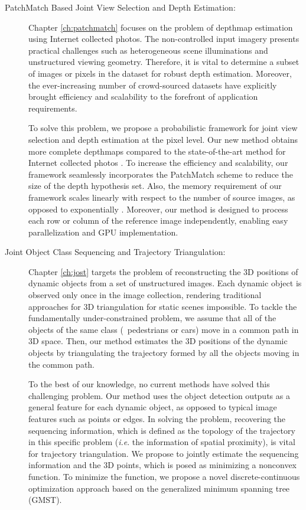 \begin{description}

\item[PatchMatch Based Joint View Selection and Depth Estimation:]
Chapter \ref{ch:patchmatch} focuses on the problem of depthmap estimation using Internet collected photos. The non-controlled input imagery presents practical challenges such as heterogeneous scene illuminations and unstructured viewing geometry. Therefore, it is vital to determine a subset of images or pixels in the dataset for robust depth estimation. Moreover, the ever-increasing number of crowd-sourced datasets have explicitly brought efficiency and scalability to the forefront of application requirements.

To solve this problem, we propose a probabilistic framework for joint view selection and depth estimation at the pixel level. Our new method obtains more complete depthmaps compared to the state-of-the-art method for Internet collected photos \cite{Goesele07}. To increase the efficiency and scalability, our framework seamlessly incorporates the PatchMatch scheme \cite{patchMatchStereo1} to  reduce the size of the depth hypothesis set. Also, the memory requirement of our framework scales linearly with respect to the number of source images, as opposed to exponentially \cite{CombinedDepthOutlier}. Moreover, our method is designed to process each row or column of the reference image independently, enabling easy parallelization and GPU implementation.

\item[Joint Object Class Sequencing and Trajectory Triangulation:]
Chapter \ref{ch:jost} targets the problem of reconstructing the 3D positions of dynamic objects from a set of unstructured images. Each dynamic object is observed only once in the image collection, rendering traditional approaches for 3D triangulation for static scenes impossible. To tackle the fundamentally under-constrained problem, we assume that all of the objects of the same class (\eg~pedestrians or cars) move in a common path in 3D space. Then, our method estimates the 3D positions of the dynamic objects by triangulating the trajectory formed by all the objects moving in the common path. 

To the best of our knowledge, no current methods have solved this challenging problem. 
Our method uses the object detection outputs as a general feature for each dynamic object, as opposed to typical image features such as points or edges. In solving the problem, recovering the sequencing information, which is defined as the topology of the trajectory in this specific problem (\emph{i.e}. the information of spatial proximity), is vital for trajectory triangulation. We propose to jointly estimate the sequencing information and the 3D points, which is posed as minimizing a nonconvex function. To minimize the function, we propose a novel discrete-continuous optimization approach based on the generalized minimum spanning tree (GMST). 


\end{description}

